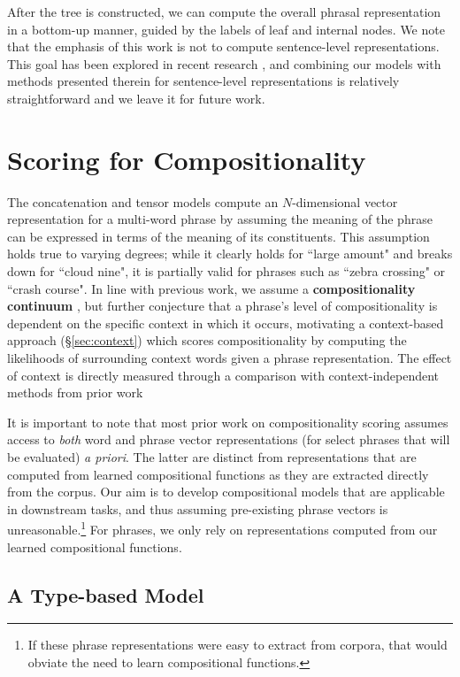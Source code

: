 \documentclass[11pt,letterpaper]{article}
\begin{document}
After the tree is constructed, we can compute the overall phrasal representation in a bottom-up manner, guided by the labels of leaf and internal nodes.
We note that the emphasis of this work is not to compute sentence-level representations. 
This goal has been explored in recent research \cite{Le2014,Kalchbrenner2014}, and combining our models with methods presented therein for sentence-level representations is relatively straightforward and we leave it for future work. 

\section{Scoring for Compositionality}
\label{sec:scoring}

The concatenation and tensor models compute an $N$-dimensional vector representation for a multi-word phrase by assuming the meaning of the phrase can be expressed in terms of the meaning of its constituents. 
This assumption holds true to varying degrees; while it clearly holds for ``large amount" and breaks down for ``cloud nine", it is partially valid for phrases such as ``zebra crossing" or ``crash course". 
In line with previous work, we assume a {\bf compositionality continuum} \cite{McCarthy2003}, but further conjecture that a phrase's level of compositionality is dependent on the specific context in which it occurs,  motivating a context-based approach (\S\ref{sec:context}) which scores compositionality by computing the likelihoods of surrounding context words given a phrase representation. 
The effect of context is directly measured through a comparison with context-independent methods from prior work \cite{Bannard2003,Reddy2011}

It is important to note that most prior work on compositionality scoring assumes access to \emph{both} word and phrase vector representations (for select phrases that will be evaluated) \emph{a priori}.  
The latter are distinct from representations that are computed from learned compositional functions as they are extracted directly from the corpus. 
Our aim is to develop compositional models that are applicable in downstream tasks, and thus assuming pre-existing phrase vectors is unreasonable.\footnote{If these phrase representations were easy to extract from corpora, that would obviate the need to learn compositional functions.}
For phrases, we only rely on representations computed from our learned compositional functions. 

\subsection{A Type-based Model}
\label{sec:independent}
\end{document}

